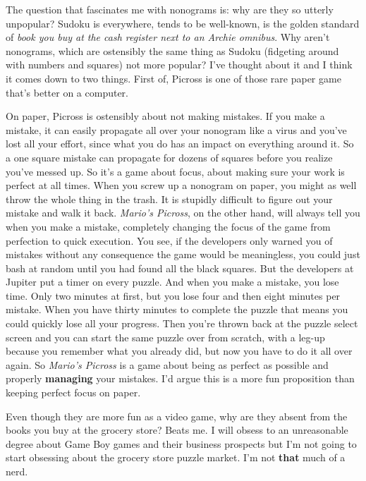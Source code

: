 \documentclass{book}
\begin{document}
The question that fascinates me with nonograms is: why are they so utterly unpopular? Sudoku is everywhere, tends to be well-known, is the golden standard of \emph{book you buy at the cash register next to an Archie omnibus}. Why aren’t nonograms, which are ostensibly the same thing as Sudoku (fidgeting around with numbers and squares) not more popular? I’ve thought about it and I think it comes down to two things. First of, Picross is one of those rare paper game that’s better on a computer.

On paper, Picross is ostensibly about not making mistakes. If you make a mistake, it can easily propagate all over your nonogram like a virus and you’ve lost all your effort, since what you do has an impact on everything around it. So a one square mistake can propagate for dozens of squares before you realize you’ve messed up. So it’s a game about focus, about making sure your work is perfect at all times. When you screw up a nonogram on paper, you might as well throw the whole thing in the trash. It is stupidly difficult to figure out your mistake and walk it back. \emph{Mario’s Picross}, on the other hand, will always tell you when you make a mistake, completely changing the focus of the game from perfection to quick execution. You see, if the developers only warned you of mistakes without any consequence the game would be meaningless, you could just bash at random until you had found all the black squares. But the developers at Jupiter put a timer on every puzzle. And when you make a mistake, you lose time. Only two minutes at first, but you lose four and then eight minutes per mistake. When you have thirty minutes to complete the puzzle that means you could quickly lose all your progress. Then you’re thrown back at the puzzle select screen and you can start the same puzzle over from scratch, with a leg-up because you remember what you already did, but now you have to do it all over again. So \emph{Mario’s Picross} is a game about being as perfect as possible and properly \textbf{managing} your mistakes. I’d argue this is a more fun proposition than keeping perfect focus on paper.

Even though they are more fun as a video game, why are they absent from the books you buy at the grocery store? Beats me. I will obsess to an unreasonable degree about Game Boy games and their business prospects but I’m not going to start obsessing about the grocery store puzzle market. I’m not \textbf{that} much of a nerd.
\end{document}
